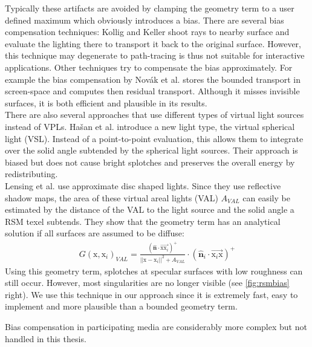 \documentclass[thesis.tex]{subfiles}
\begin{document}
Typically these artifacts are avoided by clamping the geometry term to a user defined maximum which obviously introduces a bias.
There are several bias compensation techniques:
Kollig and Keller \cite{bib:biascomp:kk04} shoot rays to nearby surface and evaluate the lighting there to transport it back to the original surface.
However, this technique may degenerate to path-tracing is thus not suitable for interactive applications.
Other techniques try to compensate the bias approximately.
For example the bias compensation by Nov\'{a}k et al. \cite{bib:biascomp:novak11} stores the bounded transport in screen-space and computes then residual transport.
Although it misses invisible surfaces, it is both efficient and plausible in its results. 
\\
There are also several approaches that use different types of virtual light sources instead of VPLs.
Ha{\v{s}}an et al. \cite{bib:biascomp:vsl} introduce a new light type, the virtual spherical light (VSL).
Instead of a point-to-point evaluation, this allows them to integrate over the solid angle subtended by the spherical light sources.
Their approach is biased but does not cause bright splotches and preserves the overall energy by redistributing.
\\
Lensing et al. \cite{bib:LightskinPaper} use approximate disc shaped lights.
Since they use reflective shadow maps, the area of these virtual areal lights (VAL) $A_{VAL}$ can easily be estimated by the distance of the VAL to the light source and the solid angle a RSM texel subtends.
They show that the geometry term has an analytical solution if all surfaces are assumed to be diffuse:
\begin{align}
G(\mathrm{x}, \mathrm{x}_i)_{VAL} = \frac{(\hat{\mathbf{n}} \cdot \overrightarrow{\mathrm{x}\mathrm{x}_i} )^+}{||\mathrm{x} - \mathrm{x}_i||^2 + A_{VAL}} \cdot (\hat{\mathbf{n}}_i \cdot \overrightarrow{\mathrm{x}_i\mathrm{x}})^+
\end{align}
Using this geometry term, splotches at specular surfaces with low roughness can still occur.
However, most singularities are no longer visible (see \autoref{fig:rsmbias} right).
We use this technique in our approach since it is extremely fast, easy to implement and more plausible than a bounded geometry term.

Bias compensation in participating media are considerably more complex but not handled in this thesis.
\end{document}
